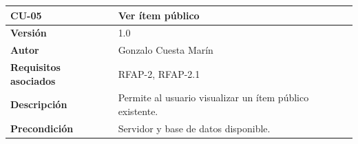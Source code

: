 \documentclass[
]{article}
\begin{document}
\begin{longtable}[]{@{}ll@{}}
\toprule
\begin{minipage}[b]{0.20\columnwidth}\raggedright
\textbf{CU-05}\strut
\end{minipage} & \begin{minipage}[b]{0.74\columnwidth}\raggedright
\textbf{Ver ítem público}\strut
\end{minipage}\tabularnewline
\midrule
\endhead
\begin{minipage}[t]{0.20\columnwidth}\raggedright
\textbf{Versión}\strut
\end{minipage} & \begin{minipage}[t]{0.74\columnwidth}\raggedright
1.0\strut
\end{minipage}\tabularnewline
\begin{minipage}[t]{0.20\columnwidth}\raggedright
\textbf{Autor}\strut
\end{minipage} & \begin{minipage}[t]{0.74\columnwidth}\raggedright
Gonzalo Cuesta Marín\strut
\end{minipage}\tabularnewline
\begin{minipage}[t]{0.20\columnwidth}\raggedright
\textbf{Requisitos asociados}\strut
\end{minipage} & \begin{minipage}[t]{0.74\columnwidth}\raggedright
RFAP-2, RFAP-2.1\strut
\end{minipage}\tabularnewline
\begin{minipage}[t]{0.20\columnwidth}\raggedright
\textbf{Descripción}\strut
\end{minipage} & \begin{minipage}[t]{0.74\columnwidth}\raggedright
Permite al usuario visualizar un ítem público existente.\strut
\end{minipage}\tabularnewline
\begin{minipage}[t]{0.20\columnwidth}\raggedright
\textbf{Precondición}\strut
\end{minipage} & \begin{minipage}[t]{0.74\columnwidth}\raggedright
Servidor y base de datos disponible.


\end{minipage}
\end{longtable}
\end{document}

